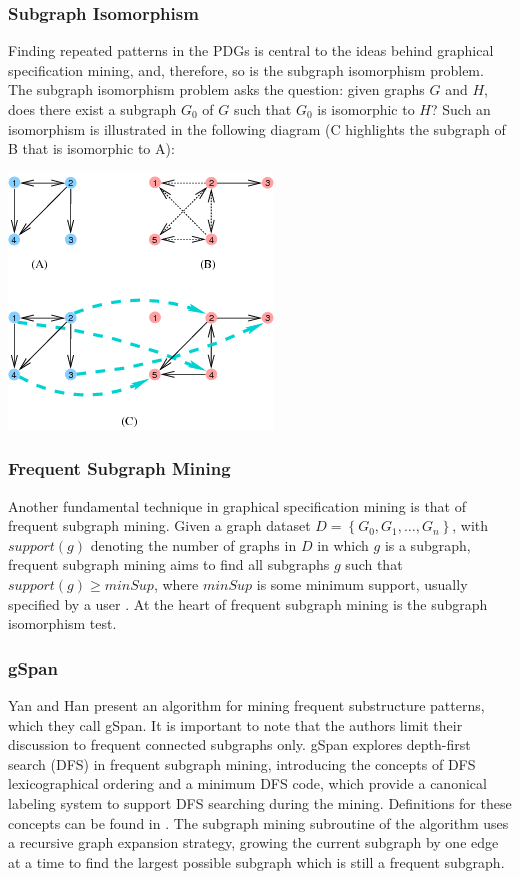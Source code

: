 \documentclass[12pt]{article}
\begin{document}
\subsubsection{Subgraph Isomorphism}
Finding repeated patterns in the PDGs is central to the ideas behind graphical
specification mining, and, therefore, so is the subgraph isomorphism problem.
The subgraph isomorphism problem asks the question: given graphs $G$ and $H$,
does there exist a subgraph $G_0$ of $G$ such that $G_0$ is isomorphic to $H$?
Such an isomorphism is illustrated in the following diagram (C highlights the 
subgraph of B that is isomorphic to A):
\begin{center}
\includegraphics{subgraph_isomorphism.png}
\end{center}

\subsubsection{Frequent Subgraph Mining}
Another fundamental technique in graphical specification mining is that of
frequent subgraph mining. Given a graph dataset
$D = \left\{ G_0, G_1, \ldots, G_n\right\}$, with $support(g)$ denoting the
number of graphs in $D$ in which $g$ is a subgraph, frequent subgraph mining
aims to find all subgraphs $g$ such that $support(g) \geq minSup$, where
$minSup$ is some minimum support, usually specified by a user
\cite{Yan:2002:GGS:844380.844811}. At the heart of frequent subgraph mining is
the subgraph isomorphism test.

\subsubsection{gSpan}
Yan and Han present an algorithm for mining frequent substructure
patterns, which they call gSpan. It is important to note that the authors
limit their discussion to frequent connected subgraphs only. gSpan explores
depth-first search (DFS) in frequent subgraph mining, introducing the concepts
of DFS lexicographical ordering and a minimum DFS code, which provide a
canonical labeling system to support DFS searching during the mining.
Definitions for these concepts can be found in
\cite{Yan:2002:GGS:844380.844811}. The subgraph mining subroutine of the
algorithm uses a recursive graph expansion strategy, growing the current
subgraph by one edge at a time to find the largest possible subgraph which is
still a frequent subgraph.
\end{document}

